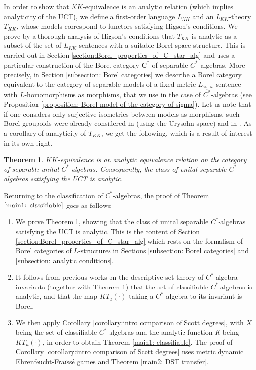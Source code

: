 \documentclass[12pt]{amsart}
\newtheorem{main}{Theorem}
\newcommand{\Cstar}{\mathbf{C^*}} %
\begin{document}
In order to show that $KK$-equivalence is an analytic relation (which implies analyticity of the UCT), we define a first-order language $L_{KK}$ and an $L_{KK}$-theory $T_{KK}$, whose models correspond to functors satisfying Higson's conditions. 
We prove by a thorough analysis of Higson's conditions that $T_{KK}$ is analytic as a subset of the set of $L_{KK}$-sentences with a suitable Borel space structure. 
This is carried out in Section \ref{section:Borel_properties_of_C_star_alg} and uses a particular construction of the Borel category $\Cstar$ of separable $C^*$-algebras. More precisely, in Section \ref{subsection: Borel categories} we describe a Borel category equivalent to the category of separable models of a fixed metric $L_{\omega_1,\omega}$-sentence with $L$-homomorphisms as morphisms, that we use in the case of $C^*$-algebras (see Proposition \ref{proposition: Borel model of the category of sigma}). Let us note that if one considers only surjective isometries between models as morphisms, such Borel groupoids were already considered in \cite{ElliottEtAl2013, MR3660238} (using the Urysohn space) and in \cite{yaacov2017metric}.
As a corollary of analyticity of $T_{KK}$, we get the following, which is a result of interest in its own right. 
\begin{main}\label{main4: KK-equivalence}
    $KK$-equivalence is an analytic equivalence relation on the category of separable unital $C^*$-algebras. Consequently, the class of unital separable $C^*$-algebras satisfying the UCT is analytic.
\end{main}
Returning to the classification of $C^*$-algebras, the proof of Theorem $\ref{main1: classifiable}$ goes as follows:
\begin{enumerate}
    \item We prove Theorem \ref{main4: KK-equivalence}, showing that the class of unital separable $C^*$-algebras satisfying the UCT is analytic. 
    This is the content of Section \ref{section:Borel_properties_of_C_star_alg} which rests on the formalism of Borel categories of $L$-structures in Sections \ref{subsection: Borel categories} and \ref{subsection: analytic conditions}.
    \item It follows from previous works on the descriptive set theory of $C^*$-algebra invariants (together with Theorem \ref{main4: KK-equivalence}) that the set of classifiable $C^*$-algebras is analytic, and that the map $KT_u(\cdot)$ taking a $C^*$-algebra to its invariant is Borel.
    \item We then apply Corollary \ref{corollary:intro comparison of Scott degrees}, with $X$ being the set of classifiable $C^*$-algebras and the analytic function $K$ being $KT_u(\cdot)$, in order to obtain Theorem \ref{main1: classifiable}. The proof of Corollary \ref{corollary:intro comparison of Scott degrees} uses metric dynamic Ehrenfeucht-Fra\"iss\'e games and Theorem \ref{main2: DST transfer}.
\end{enumerate}
\end{document}
